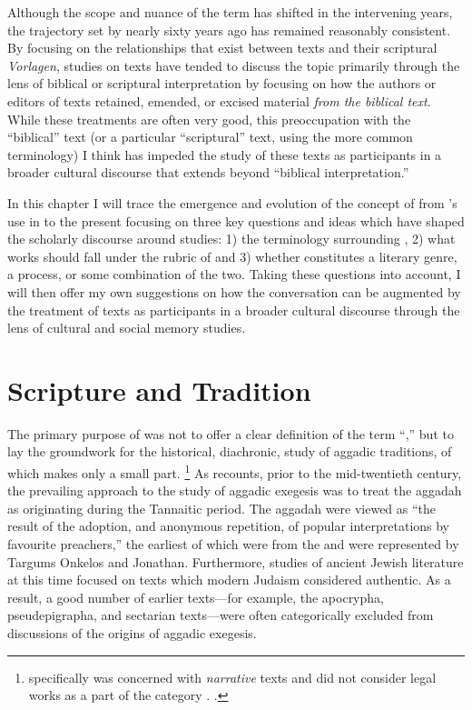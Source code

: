 Although the scope and nuance of the term \rwb has shifted in the intervening years, the trajectory set by \vermes nearly sixty years ago has remained reasonably consistent. By focusing on the relationships that exist between \rwb texts and their scriptural \emph{Vorlagen}, studies on \rwb texts have tended to discuss the topic primarily through the lens of biblical or scriptural interpretation by focusing on how the authors or editors of \rwb texts retained, emended, or excised material \emph{from the biblical text}. While these treatments are often very good, this preoccupation with the ``biblical'' text (or a particular ``scriptural'' text, using the more common terminology) I think has impeded the study of these texts as participants in a broader cultural discourse that extends beyond ``biblical interpretation.''

In this chapter I will trace the emergence and evolution of the concept of \rwb from \vermes's use in  to the present focusing on three key questions and ideas which have shaped the scholarly discourse around \rwb studies: 1) the terminology surrounding \rwb, 2) what works should fall under the rubric of \rwb and 3) whether \rwb constitutes a literary genre, a process, or some combination of the two. Taking these questions into account, I will then offer my own suggestions on how the \rwb conversation can be augmented by the treatment of \rwb texts as participants in a broader cultural discourse through the lens of cultural and social memory studies.

\section{Scripture and Tradition}

The primary purpose of  was not to offer a clear definition of the term ``\rwb,'' but to lay the groundwork for the historical, diachronic, study of aggadic traditions, of which \rwb makes only a small part.%
    \footnote{%
        \vermes specifically was concerned with \emph{narrative} texts and did not consider legal works as a part of the category \rwb. 
        \cite[3]{vermes_zsengeller2014}.}
As \vermes recounts, prior to the mid-twentieth century, the prevailing approach to the study of aggadic exegesis was to treat the aggadah as originating during the Tannaitic period. The aggadah were viewed as ``the result of the adoption, and anonymous repetition, of popular interpretations by favourite preachers,''%
    \autocite[3]{vermes1961}
the earliest of which were from the  and were represented by Targums Onkelos and Jonathan. Furthermore, studies of ancient Jewish literature at this time focused on texts which modern Judaism considered authentic. As a result, a good number of earlier texts---for example, the apocrypha, pseudepigrapha, and sectarian texts---were often categorically excluded from discussions of the origins of aggadic exegesis.%
    \autocite[2]{vermes1961} 

